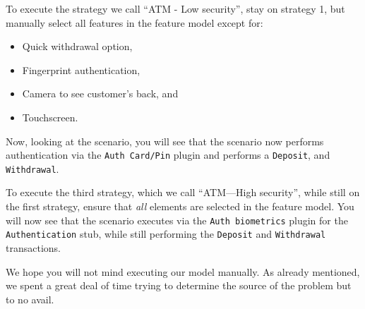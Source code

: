 \documentclass[10pt,fleqn]{article}
\begin{document}
	To execute the strategy we call ``ATM - Low security'', stay on strategy
	1, but manually select all features in the feature model except for:
	\begin{itemize}
		\item{Quick withdrawal option,}
		\item{Fingerprint authentication,}
		\item{Camera to see customer's back, and}
		\item{Touchscreen.}
	\end{itemize}

	Now, looking at the scenario, you will see that the scenario now performs
	authentication via the \texttt{Auth Card/Pin} plugin and performs 
	a \texttt{Deposit}, and \texttt{Withdrawal}.

	To execute the third strategy, which we call ``ATM---High security'', 
	while still on the first strategy, ensure that \textit{all} elements are 
	selected
	in the feature model.  You will now see that the scenario executes via
	the \texttt{Auth biometrics} plugin for the \texttt{Authentication} stub,
	while still performing the \texttt{Deposit} and \texttt{Withdrawal}
	transactions.

	We hope you will not mind executing our model manually.  As already
	mentioned, we spent a great deal of time trying to determine the source
	of the problem but to no avail.
\end{document}
